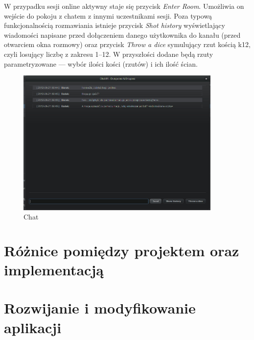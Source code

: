 W przypadku sesji online aktywny staje się przycisk \emph{Enter Room}. Umożliwia on wejście do pokoju z chatem z innymi uczestnikami sesji. Poza typową funkcjonalnością rozmawiania istnieje przycisk \emph{Shot history} wyświetlający wiadomości napisane przed dołączeniem danego użytkownika do kanału (przed otwarciem okna rozmowy) oraz przycisk \emph{Throw a dice} symulujący rzut kością k12, czyli losujący liczbę z zakresu 1--12. W przyszłości dodane będą rzuty parametryzowane --- wybór ilości kości (rzutów) i ich ilość ścian.
\clearpage
\begin{figure}[h!]	
\centering
\includegraphics[width=0.9\textwidth]{./img/interfejsy/chat}
\caption{Chat}
\label{fig:faq}
\end{figure}


\section{Różnice pomiędzy projektem oraz implementacją}
\label{sec:roznice}



\section{Rozwijanie i modyfikowanie aplikacji}
\label{sec:rozwoj}

